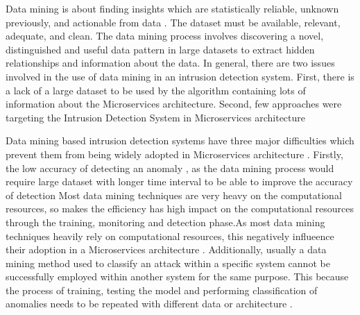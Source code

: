 Data mining is about finding insights which are statistically reliable, unknown previously, and actionable from data \cite{phua2010comprehensive}. The dataset must be available, relevant, adequate, and clean. The data mining process involves discovering a novel, distinguished and useful data pattern in large datasets to extract hidden relationships and information about the data. In general, there are two issues involved in the use of data mining in an intrusion detection system. First, there is a lack of a large dataset to be used by the algorithm containing lots of information about the Microservices architecture. Second, few approaches were targeting the Intrusion Detection System in Microservices architecture \cite{phua2010comprehensive}

Data mining based intrusion detection systems have three major difficulties which prevent them from being widely adopted in Microservices architecture \cite{lunt1992real,Patcha:2007hja}. Firstly, the low accuracy of detecting an anomaly \cite{gupta2016network,Patcha:2007hja}, as the data mining process would require large dataset with longer time interval to be able to improve the accuracy of detection 
Most data mining techniques are very heavy on the computational resources, so makes the efficiency has high impact on the computational resources through the training, monitoring and detection phase.As most data mining techniques heavily rely on computational resources, this negatively influeence their adoption  in a Microservices architecture  \cite{Patcha:2007hja}. Additionally, usually a data mining method used to classify an attack within a specific system cannot be successfully employed within another system for the same purpose. This because the process of training, testing the model and performing classification of anomalies needs to be repeated with different data or architecture \cite{Buczak:2016kt}.  

